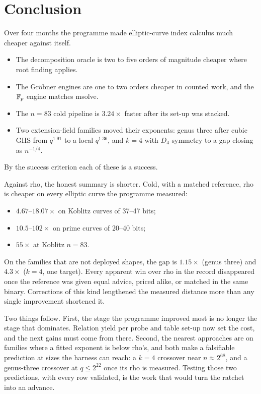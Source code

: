 \section{Conclusion}\label{sec:conclusion}

Over four months the programme made elliptic-curve index calculus much
cheaper against itself.
\begin{itemize}
\item The decomposition oracle is two to five orders of magnitude cheaper
  where root finding applies.
\item The Gr\"obner engines are one to two orders cheaper in counted work,
  and the $\mathbb{F}_p$ engine matches msolve.
\item The $n=83$ cold pipeline is $3.24\times$ faster after its set-up was
  stacked.
\item Two extension-field families moved their exponents: genus three
  after cubic GHS from $q^{1.91}$ to a local $q^{1.36}$, and $k=4$ with
  $D_4$ symmetry to a gap closing as $n^{-1/4}$.
\end{itemize}
By the success criterion each of these is a success.

Against rho, the honest summary is shorter. Cold, with a matched reference,
rho is cheaper on every elliptic curve the programme measured:
\begin{itemize}
\item $4.67$--$18.07\times$ on Koblitz curves of 37--47 bits;
\item $10.5$--$102\times$ on prime curves of 20--40 bits;
\item $55\times$ at Koblitz $n=83$.
\end{itemize}
On the families that are not deployed shapes, the gap is $1.15\times$
(genus three) and $4.3\times$ ($k=4$, one target). Every apparent win over
rho in the record disappeared once the reference was given equal advice,
priced alike, or matched in the same binary. Corrections of this kind
lengthened the measured distance more than any single improvement
shortened it.

Two things follow. First, the stage the programme improved most is no
longer the stage that dominates. Relation yield per probe and table set-up
now set the cost, and the next gains must come from there. Second, the
nearest approaches are on families where a fitted exponent is below rho's,
and both make a falsifiable prediction at sizes the harness can reach: a
$k=4$ crossover near $n\approx2^{68}$, and a genus-three crossover at
$q\le2^{22}$ once its rho is measured. Testing those two predictions, with
every row validated, is the work that would turn the ratchet into an
advance.
